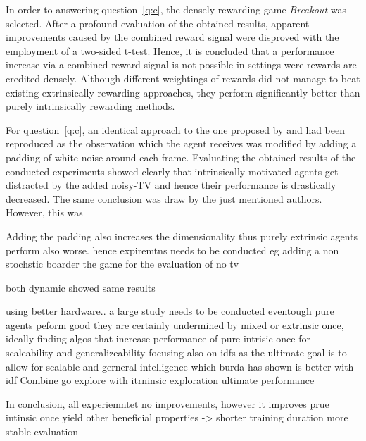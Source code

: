 \documentclass[draft,final]{vutinfth} %
\begin{document}
    In order to answering question~\ref{q:c}, the densely rewarding game \textit{Breakout} was selected.
    After a profound evaluation of the obtained results, apparent improvements caused by the combined reward signal were disproved with the employment of a two-sided t-test.
    Hence, it is concluded that a performance increase via a combined reward signal is not possible in settings were rewards are credited densely.
    Although different weightings of rewards did not manage to beat existing extrinsically rewarding approaches, they perform significantly better than purely intrinsically rewarding methods.

    For question~\ref{q:c}, an identical approach to the one proposed by \citet{pathak_curiosity-driven_2017-1} and \citet{burda_large-scale_2018-1} had been reproduced as the observation which the agent receives was modified by adding a padding of white noise around each frame.
    Evaluating the obtained results of the conducted experiments showed clearly that intrinsically motivated agents get distracted by the added noisy-TV and hence their performance is drastically decreased.
    The same conclusion was draw by the just mentioned authors.
    However, this was


    Adding the padding also increases the dimensionality thus purely extrinsic agents perform also worse. hence expiremtns needs to be conducted eg adding a non stochstic boarder the game for the evaluation of no tv

    both dynamic showed same results

    using better hardware.. a large study needs to be conducted
    eventough pure agents peform good they are certainly undermined by mixed or extrinsic once, ideally finding algos that increase performance of pure intrisic once for scaleability and generalizeability
    focusing also on idfs as the ultimate goal is to allow for scalable and gerneral intelligence which burda has shown is better with idf
    Combine go explore with itrninsic exploration ultimate performance

    In conclusion,
    all experiemntet no improvements,
    however it improves prue intinsic once
    yield other beneficial properties -> shorter training duration more stable evaluation

    \backmatter
    \listoffigures %

    \cleardoublepage %
    \listoftables %
\end{document}
